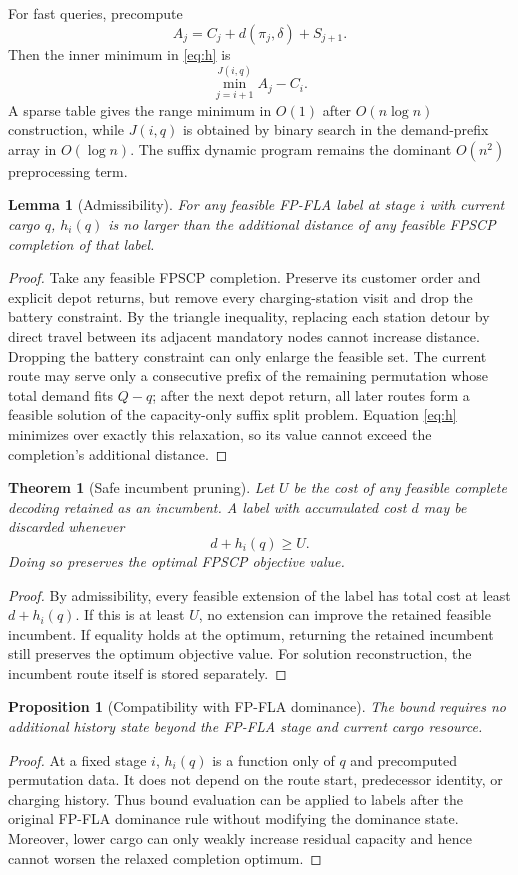 \documentclass[11pt]{article}
\newtheorem{theorem}{Theorem}
\newtheorem{lemma}{Lemma}
\newtheorem{proposition}{Proposition}
\newcommand{\depot}{\delta}
\begin{document}
For fast queries, precompute
\[
A_j=C_j+d(\pi_j,\depot)+S_{j+1}.
\]
Then the inner minimum in \eqref{eq:h} is
\[
\min_{j=i+1}^{J(i,q)} A_j-C_i.
\]
A sparse table gives the range minimum in $O(1)$ after $O(n\log n)$ construction, while $J(i,q)$ is obtained by binary search in the demand-prefix array in $O(\log n)$. The suffix dynamic program remains the dominant $O(n^2)$ preprocessing term.

\begin{lemma}[Admissibility]
For any feasible FP-FLA label at stage $i$ with current cargo $q$, $h_i(q)$ is no larger than the additional distance of any feasible FPSCP completion of that label.
\end{lemma}
\begin{proof}
Take any feasible FPSCP completion. Preserve its customer order and explicit depot returns, but remove every charging-station visit and drop the battery constraint. By the triangle inequality, replacing each station detour by direct travel between its adjacent mandatory nodes cannot increase distance. Dropping the battery constraint can only enlarge the feasible set. The current route may serve only a consecutive prefix of the remaining permutation whose total demand fits $Q-q$; after the next depot return, all later routes form a feasible solution of the capacity-only suffix split problem. Equation \eqref{eq:h} minimizes over exactly this relaxation, so its value cannot exceed the completion's additional distance.
\end{proof}

\begin{theorem}[Safe incumbent pruning]
Let $U$ be the cost of any feasible complete decoding retained as an incumbent. A label with accumulated cost $d$ may be discarded whenever
\[
d+h_i(q)\ge U.
\]
Doing so preserves the optimal FPSCP objective value.
\end{theorem}
\begin{proof}
By admissibility, every feasible extension of the label has total cost at least $d+h_i(q)$. If this is at least $U$, no extension can improve the retained feasible incumbent. If equality holds at the optimum, returning the retained incumbent still preserves the optimum objective value. For solution reconstruction, the incumbent route itself is stored separately.
\end{proof}

\begin{proposition}[Compatibility with FP-FLA dominance]
The bound requires no additional history state beyond the FP-FLA stage and current cargo resource.
\end{proposition}
\begin{proof}
At a fixed stage $i$, $h_i(q)$ is a function only of $q$ and precomputed permutation data. It does not depend on the route start, predecessor identity, or charging history. Thus bound evaluation can be applied to labels after the original FP-FLA dominance rule without modifying the dominance state. Moreover, lower cargo can only weakly increase residual capacity and hence cannot worsen the relaxed completion optimum.
\end{proof}
\end{document}
